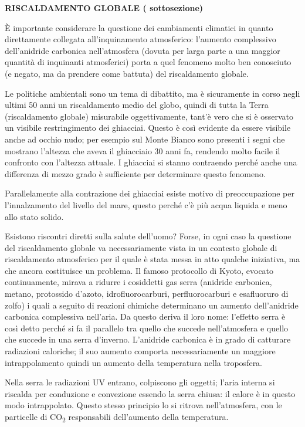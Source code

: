\documentclass[]{article}
\begin{document}
\textbf{RISCALDAMENTO GLOBALE ( sottosezione)}

È importante considerare la questione dei cambiamenti climatici in
quanto direttamente collegata all'inquinamento atmosferico: l'aumento
complessivo dell'anidride carbonica nell'atmosfera (dovuta per larga
parte a una maggior quantità di inquinanti atmosferici) porta a quel
fenomeno molto ben conosciuto (e negato, ma da prendere come battuta)
del riscaldamento globale.

Le politiche ambientali sono un tema di dibattito, ma è sicuramente in
corso negli ultimi 50 anni un riscaldamento medio del globo, quindi di
tutta la Terra (riscaldamento globale) misurabile oggettivamente, tant'è
vero che si è osservato un visibile restringimento dei ghiacciai. Questo
è così evidente da essere visibile anche ad occhio nudo; per esempio sul
Monte Bianco sono presenti i segni che mostrano l'altezza che aveva il
ghiacciaio 30 anni fa, rendendo molto facile il confronto con l'altezza
attuale. I ghiacciai si stanno contraendo perché anche una differenza di
mezzo grado è sufficiente per determinare questo fenomeno.

Parallelamente alla contrazione dei ghiacciai esiste motivo di
preoccupazione per l'innalzamento del livello del mare, questo perché
c'è più acqua liquida e meno allo stato solido.

Esistono riscontri diretti sulla salute dell'uomo? Forse, in ogni caso
la questione del riscaldamento globale va necessariamente vista in un
contesto globale di riscaldamento atmosferico per il quale è stata messa
in atto qualche iniziativa, ma che ancora costituisce un problema. Il
famoso protocollo di Kyoto, evocato continuamente, mirava a ridurre i
cosiddetti gas serra (anidride carbonica, metano, protossido d'azoto,
idrofluorocarburi, perfluorocarburi e esafluoruro di zolfo) i quali a
seguito di reazioni chimiche determinano un aumento dell'anidride
carbonica complessiva nell'aria. Da questo deriva il loro nome:
l'effetto serra è così detto perché si fa il parallelo tra quello che
succede nell'atmosfera e quello che succede in una serra d'inverno.
L'anidride carbonica è in grado di catturare radiazioni caloriche; il
suo aumento comporta necessariamente un maggiore intrappolamento quindi
un aumento della temperatura nella troposfera.

Nella serra le radiazioni UV entrano, colpiscono gli oggetti; l'aria
interna si riscalda per conduzione e convezione essendo la serra chiusa:
il calore è in questo modo intrappolato. Questo stesso principio lo si
ritrova nell'atmosfera, con le particelle di CO\textsubscript{2}
responsabili dell'aumento della temperatura.
\end{document}
